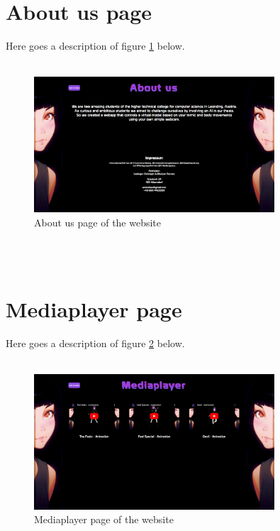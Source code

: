 \section{About us page}
Here goes a description of figure \ref{fig:aboutpage} below.
\\
\\
\begin{figure}[htb]
    \centering
    \includegraphics[width=0.8\textwidth]{pics/Animotion_aboutus.png}
    \caption{About us page of the website}
    \label{fig:aboutpage}
\end{figure}
\\
\\
\section{Mediaplayer page}
Here goes a description of figure \ref{fig:mediaplayerpage} below.
\\
\\
\begin{figure}[htb]
    \centering
    \includegraphics[width=0.8\textwidth]{pics/Animotion_mediaplayer.png}
    \caption{Mediaplayer page of the website}
    \label{fig:mediaplayerpage}
\end{figure}
\\
\\
